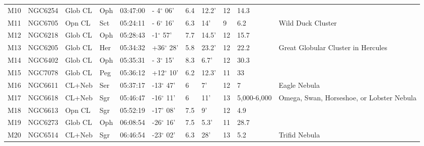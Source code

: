 \documentclass[10pt,twoside,a4paper,english]{article}
\begin{document}
\begin{longtable}{@{}lllllllllll@{}}
M10        & NGC6254     & Glob CL    & Oph       & 03:47:00 & - 4$^{\circ}$ 06'  & 6.4       & 12.2'                & 12       & 14.3                &                                           \\ 
M11        & NGC6705     & Opn CL     & Sct       & 05:24:11 & - 6$^{\circ}$ 16'  & 6.3       & 14'                  & 9        & 6.2                 & Wild Duck Cluster                         \\ 
M12        & NGC6218     & Glob CL    & Oph       & 05:28:43 & -1$^{\circ}$ 57'   & 7.7       & 14.5'                & 12       & 15.7                &                                           \\ 
M13        & NGC6205     & Glob CL    & Her       & 05:34:32 & +36$^{\circ}$ 28'  & 5.8       & 23.2'                & 12       & 22.2                & Great Globular Cluster in Hercules        \\ 
M14        & NGC6402     & Glob CL    & Oph       & 05:35:31 & - 3$^{\circ}$ 15'  & 8.3       & 6.7'                 & 12       & 30.3                &                                           \\ 
M15        & NGC7078     & Glob CL    & Peg       & 05:36:12 & +12$^{\circ}$ 10'  & 6.2       & 12.3'                & 11       & 33                  &                                           \\ 
M16        & NGC6611     & CL+Neb     & Ser       & 05:37:17 & -13$^{\circ}$ 47'  & 6         & 7'                   & 12       & 7                   & Eagle Nebula                              \\ 
M17        & NGC6618     & CL+Neb     & Sgr       & 05:46:47 & -16$^{\circ}$ 11'  & 6         & 11'                  & 13       & 5,000-6,000         & Omega, Swan, Horseshoe, or Lobster Nebula \\ 
M18        & NGC6613     & Opn CL     & Sgr       & 05:52:19 & -17$^{\circ}$ 08'  & 7.5       & 9'                   & 12       & 4.9                 &                                           \\ 
M19        & NGC6273     & Glob CL    & Oph       & 06:08:54 & -26$^{\circ}$ 16'  & 7.5       & 5.3'                 & 11       & 28.7                &                                           \\ 
M20        & NGC6514     & CL+Neb     & Sgr       & 06:46:54 & -23$^{\circ}$ 02'  & 6.3       & 28'                  & 13       & 5.2                 & Trifid Nebula                             \\ 

\end{longtable}
\end{document}
